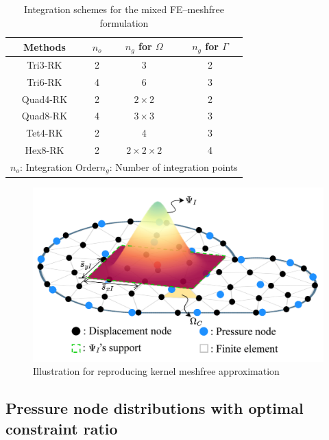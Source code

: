 \begin{table}[H]
\centering
\caption{Integration schemes for the mixed FE--meshfree formulation}
\label{tab_gauss}
\begin{tabular}{cccc}
\toprule
Methods & $n_o$ &$n_g$ for $\Omega$ & $n_g$ for $\Gamma$ \\
\midrule
Tri3-RK & 2 & 3 & 2 \\
Tri6-RK & 4 & 6 & 3 \\
Quad4-RK & 2 & $2\times2$ & 2 \\
Quad8-RK & 4 & $3\times3$ & 3 \\
Tet4-RK & 2 & 4 & 3 \\
Hex8-RK & 2 & $2\times2\times2$ & 4 \\
\multicolumn{4}{l}{\footnotesize{$n_o$: Integration Order\quad $n_g$: Number of integration points}} \\
\bottomrule
\end{tabular}
\end{table}



\begin{figure}[H]
\centering
\includegraphics[width=\textwidth]{mix.png}
\caption{Illustration for reproducing kernel meshfree approximation}\label{fg:rk_approximation}
\end{figure}

\subsection{Pressure node distributions with optimal constraint ratio}\label{subsec:optimal_constraint_ratio}

